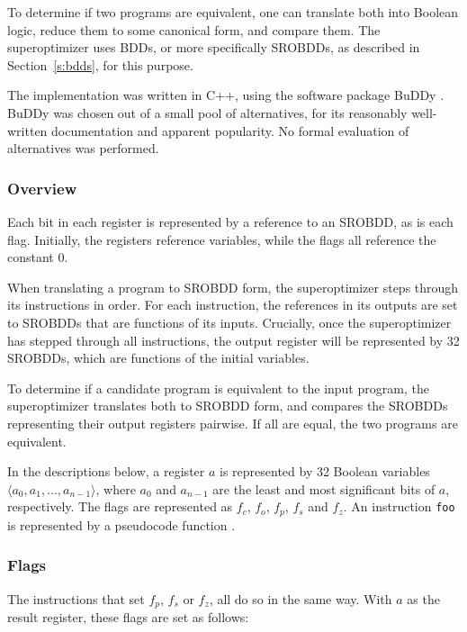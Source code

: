 \documentclass[a4paper,11pt]{kth-mag}
\begin{document}
To determine if two programs are equivalent, one can translate both into Boolean logic, reduce them to some canonical form, and compare them.
The superoptimizer uses BDDs, or more specifically SROBDDs, as described in Section~\ref{s:bdds}, for this purpose.

The implementation was written in C++, using the software package BuDDy \cite{buddy}.
BuDDy was chosen out of a small pool of alternatives, for its reasonably well-written documentation and apparent popularity.
No formal evaluation of alternatives was performed.

\subsubsection{Overview}

Each bit in each register is represented by a reference to an SROBDD, as is each flag.
Initially, the registers reference variables, while the flags all reference the constant 0.

When translating a program to SROBDD form, the superoptimizer steps through its instructions in order.
For each instruction, the references in its outputs are set to SROBDDs that are functions of its inputs.
Crucially, once the superoptimizer has stepped through all instructions, the output register will be represented by 32 SROBDDs, which are functions of the initial variables.

To determine if a candidate program is equivalent to the input program, the superoptimizer translates both to SROBDD form, and compares the SROBDDs representing their output registers pairwise.
If all are equal, the two programs are equivalent.

In the descriptions below, a register $a$ is represented by 32 Boolean variables $\langle a_0, a_1, ..., a_{n-1} \rangle$, where $a_0$ and $a_{n-1}$ are the least and most significant bits of $a$, respectively.
The flags are represented as $f_c$, $f_o$, $f_p$, $f_s$ and $f_z$.
An instruction \verb|foo| is represented by a pseudocode function .


\subsubsection{Flags}

The instructions that set $f_p$, $f_s$ or $f_z$, all do so in the same way.
With $a$ as the result register, these flags are set as follows:
\end{document}
